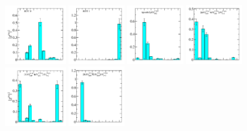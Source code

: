 \begin{figure}
  \includegraphics[width=0.24\textwidth]{figures/spectrum_a1gm/with_tq/zfactors/zfactor_isotriplet-S0-P000-A1gm_1-ROT-0.pdf}
  \includegraphics[width=0.22\textwidth]{figures/spectrum_a1gm/with_tq/zfactors/zfactor_isotriplet-S0-P000-A1gm_1-ROT-1.pdf}
  \includegraphics[width=0.22\textwidth]{figures/spectrum_a1gm/with_tq/zfactors/zfactor_tquudu3p-P000-A1gm_1-SS_2.pdf}
  \includegraphics[width=0.22\textwidth]{figures/spectrum_a1gm/with_tq/zfactors/zfactor_isotriplet_phi_pion-A1gm_1-P000-A1up-SS_0-P000-A1um-SS_0.pdf}\\
  \includegraphics[width=0.24\textwidth]{figures/spectrum_a1gm/with_tq/zfactors/zfactor_isotriplet_eta_pion-A1gm_1-P000-A1up-SS_0-P000-A1um-SS_0.pdf}
  \includegraphics[width=0.22\textwidth]{figures/spectrum_a1gm/with_tq/zfactors/zfactor_isotriplet_kaon_kbar-A1gm_1-P000-A1u-SS_0-P000-A1u-SS_0.pdf}

\end{figure}

